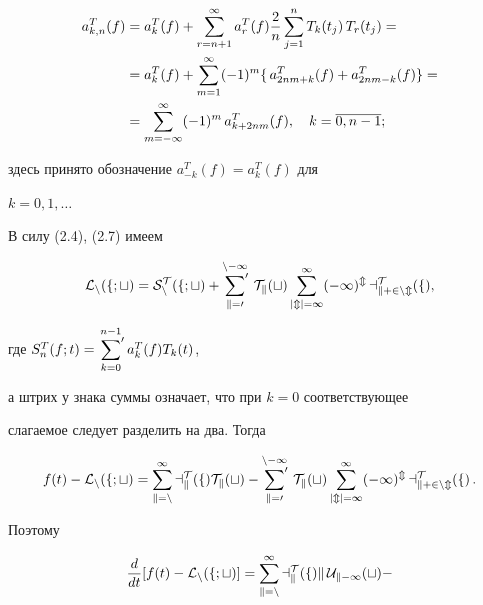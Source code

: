 \begin{pf}
\begin{align}
a_{k,n}^T(f) &= a_k^T(f) +\sum_{r=n+1}^\infty a_r^T(f)\frac{2}{n}


\sum_{j=1}^nT_k(t_j)\, T_r(t_j)=\notag\\


%


&= a_k^T(f)+\sum_{m=1}^\infty (-1)^m\{\, a^T_{2nm+k}(f) +


a^T_{2nm-k}(f)\} =\notag\\


%


&= \sum_{m=-\infty }^\infty (-1)^m \, a^T_{k+2nm}(f),


\quad k=\overline{0,n-1} ;


\end{align}


здесь принято обозначение $a_{-k}^T(f)=a_k^T(f)$ для 


$k=0, 1, \dotsc$





В силу (2.4), (2.7) имеем


\begin{equation}


\cal{L}_n(f;t)=S_n^T(f;t) +\sideset{}{'}\sum_{k=0}^{n-1}\, T_k(t)


\sum_{|m|=1}^\infty (-1)^m\, a^T_{k+2nm}(f),


\end{equation}


где $S_n^T(f;t)=\sideset{}{'}\sum\limits_{k=0}^{n-1} a_k^T(f)T_k(t)$,


а штрих у знака суммы означает, что при $k=0$ соответствующее


слагаемое следует разделить на два. Тогда


\begin{equation}


f(t)-\cal{L}_n(f;t)=


\sum_{k=n}^\infty a_k^T(f)T_k(t) -


\sideset{}{'}\sum_{k=0}^{n-1}\, T_k(t)\sum_{|m|=1}^\infty (-1)^m\,


a^T_{k+2nm}(f)\, .


\end{equation}


Поэтому


\begin{equation}


\frac{d}{dt}[f(t)-\cal{L}_n(f;t)]=


\sum_{k=n}^\infty a_k^T(f) k\, U_{k-1}(t) -



\end{equation}
\end{pf}
